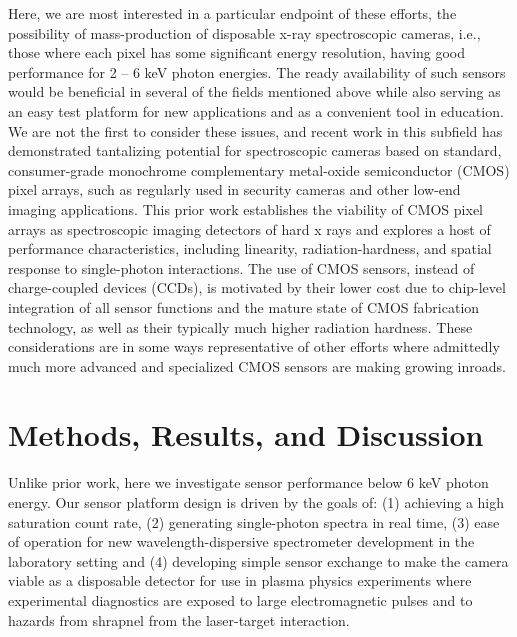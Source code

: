 Here, we are most interested in a particular endpoint of these efforts,
the possibility of mass-production of disposable x-ray spectroscopic
cameras, i.e., those where each pixel has some significant energy
resolution, having good performance for 2 -- 6 keV photon energies. The
ready availability of such sensors would be beneficial in several of the
fields mentioned above while also serving as an easy test platform for
new applications and as a convenient tool in education. We are not the
first to consider these issues, and recent work in this subfield has
demonstrated tantalizing potential for spectroscopic cameras based on
standard, consumer-grade monochrome complementary metal-oxide
semiconductor (CMOS) pixel
arrays, \cite{servoli2010characterization, lane2012x} such as
regularly used in security cameras and other low-end imaging
applications. This prior work establishes the viability of CMOS pixel
arrays as spectroscopic imaging detectors of hard x rays and explores a
host of performance characteristics, including linearity,
radiation-hardness, and spatial response to single-photon interactions.
The use of CMOS sensors, instead of charge-coupled devices (CCDs), is
motivated by their lower cost due to chip-level integration of all
sensor functions and the mature state of CMOS fabrication technology, as
well as their typically much higher radiation
hardness\emph{.} These
considerations are in some ways representative of other efforts where
admittedly much more advanced and specialized CMOS sensors are making
growing inroads. 

\section{Methods, Results, and Discussion}
Unlike prior work, here we investigate sensor performance below 6 keV
photon energy. Our sensor platform design is driven by the goals of: (1)
achieving a high saturation count rate, (2) generating single-photon
spectra in real time, (3) ease of operation for new
wavelength-dispersive spectrometer development in the laboratory
setting \cite{seidler2014laboratory} and (4)
developing simple sensor exchange to make the camera viable as a
disposable detector for use in plasma physics experiments where
experimental diagnostics are exposed to large electromagnetic pulses and
to hazards from shrapnel from the laser-target interaction.

